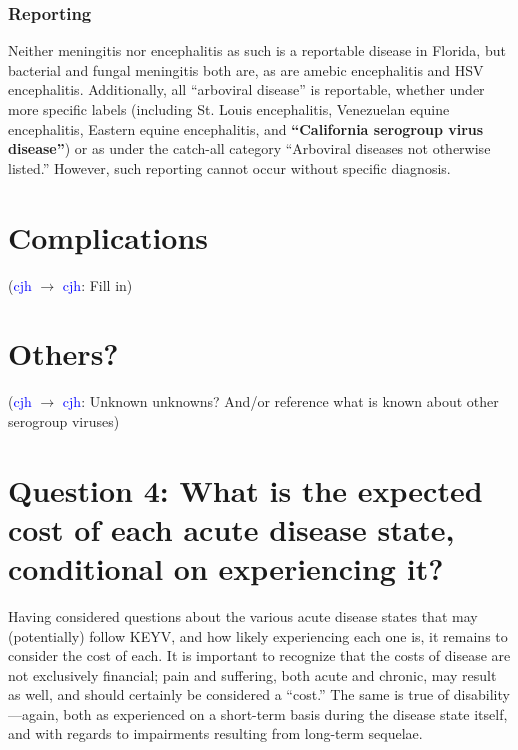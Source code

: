 \documentclass[12pt]{article}
\newcommand{\cjh}{\textcolor{blue}{cjh}}
\newcommand{\tjh}{\textcolor{red}{tjh}}
\newcommand{\msg}[3]{(#1 $\rightarrow$ #2: #3)}
\newcommand{\mcc}[1]{\msg\cjh\cjh{#1}}
\newcommand{\mtc}[1]{\msg\tjh\cjh{#1}}
\begin{document}
        \subsubsection{Reporting}
            Neither meningitis nor encephalitis as such is a reportable disease in Florida, but bacterial and fungal meningitis both are, as are amebic encephalitis and HSV encephalitis. Additionally, all ``arboviral disease'' is reportable, whether under more specific labels (including St. Louis encephalitis, Venezuelan equine encephalitis, Eastern equine encephalitis, and \textbf{``California serogroup virus disease''}) or as under the catch-all category ``Arboviral diseases not otherwise listed.'' However, such reporting cannot occur without specific diagnosis.

        \section{Complications}
            \mcc{Fill in}

        \section{Others?}
            \mcc{Unknown unknowns? And/or reference what is known about other serogroup viruses}

    \section[Expected costs, given diseases]{Question 4: What is the expected cost of each acute disease state, conditional on experiencing it?}
        Having considered questions about the various acute disease states that may (potentially) follow KEYV, and how likely experiencing each one is, it remains to consider the cost of each. It is important to recognize that the costs of disease are not exclusively financial; pain and suffering, both acute and chronic, may result as well, and should certainly be considered a ``cost.'' The same is true of disability---again, both as experienced on a short-term basis during the disease state itself, and with regards to impairments resulting from long-term sequelae.

        
\end{document}
